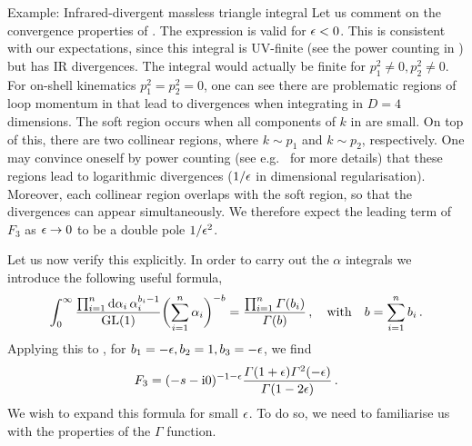\begin{example}{Example: Infrared-divergent massless triangle integral}
Let us comment on the convergence properties of .
The expression is valid for $\epsilon<0$. 
This is consistent with our expectations, since this integral is UV-finite (see the power counting in ) but has IR divergences.
The integral would actually be finite for $p_1^2 \neq 0, p_2^2 \neq 0$.
For on-shell kinematics $p_1^2=p_2^2=0$, one can see there are problematic regions of loop momentum in 
that lead to divergences when integrating in $D=4$ dimensions. 
The soft region occurs when all components of $k$ in  are small. 
On top of this, there are two collinear regions, where $k \sim p_1$ and $k\sim p_2$, respectively. 
One may convince oneself by power counting (see e.g.~\cite{ch4Agarwal:2021ais}  
for more details) that these regions lead to logarithmic divergences ($1/\epsilon$ in dimensional regularisation).
Moreover, each collinear region overlaps with the soft region, so that the divergences can appear simultaneously. 
We therefore expect the leading term of $F_3$ as $\epsilon \to 0$ to be a double pole $1/\epsilon^2$.


Let us now verify this explicitly.
In order to carry out the $\alpha$ integrals we introduce the following useful formula,
\begin{align}\label{alpha_integrals}
\int_0^\infty \frac{\prod_{i=1}^{n} \d\alpha_{i}\,
\alpha_{i}^{b_i-1}}{{\rm GL}(1)} \biggl(\sum_{i=1}^{n} \alpha_i \biggr)^{-b} = \frac{ \prod_{i=1}^{n} \Gamma(b_i )} {\Gamma( b)} \,,\quad {\rm with} \quad b=\sum_{i=1}^{n} b_i\,.
\end{align}
Applying this to , for $b_1=-\epsilon, b_2 = 1, b_3=-\epsilon$,  we find
\begin{align}
F_{3} = (-s-\i 0)^{-1-\eps} \frac{\Gamma(1+\eps) \Gamma^2(-\eps)}{\Gamma(1-2 \eps)} \,.
\end{align}
We wish to expand this formula for small $\epsilon$. To do so, we need to familiarise us with the properties of the $\Gamma$ function.


\end{example}
